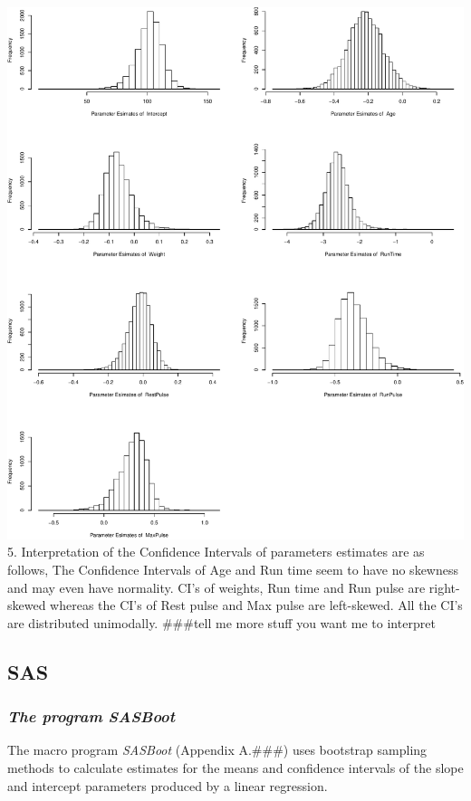 \documentclass[]{article}
\begin{document}
\includegraphics{Report_files/figure-latex/rcode-1.pdf} 5.
Interpretation of the Confidence Intervals of parameters estimates are
as follows, The Confidence Intervals of Age and Run time seem to have no
skewness and may even have normality. CI's of weights, Run time and Run
pulse are right-skewed whereas the CI's of Rest pulse and Max pulse are
left-skewed. All the CI's are distributed unimodally. \#\#\#tell me more
stuff you want me to interpret

\pagebreak 

\subsection{SAS}\label{sas}

\subsubsection{\texorpdfstring{\emph{The program
SASBoot}}{The program SASBoot}}\label{the-program-sasboot}

The macro program \emph{SASBoot} (Appendix A.\#\#\#) uses bootstrap
sampling methods to calculate estimates for the means and confidence
intervals of the slope and intercept parameters produced by a linear
regression.
\end{document}
